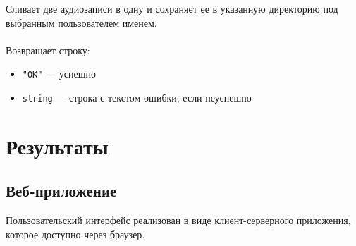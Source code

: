 \documentclass[14pt,a4paper]{article}
\begin{document}
\noindent Сливает две аудиозаписи в одну и сохраняет ее в указанную директорию под выбранным пользователем именем. \\\\
Возвращает строку:
\smallskip
\begin{itemize}
\item \lstinline{"OK"} --- успешно
\item \lstinline{string} --- строка с текстом ошибки, если неуспешно
\end{itemize}

\newpage

\section[Результаты]{\huge Результаты}

\subsection{Веб-приложение}

Пользовательский интерфейс реализован в виде клиент-серверного приложения, которое доступно через браузер. \\
\end{document}
